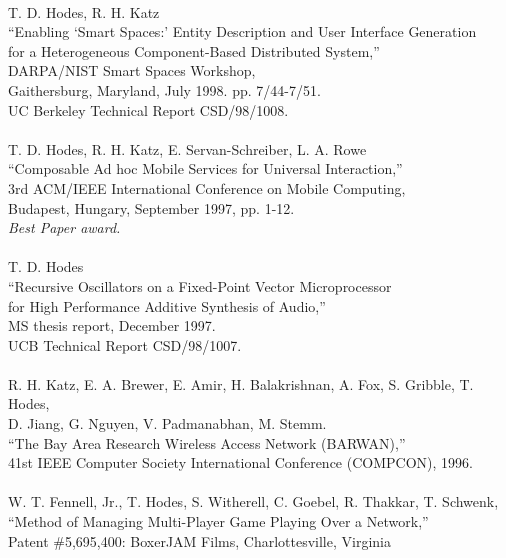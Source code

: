 \begin{tabbing}
\smallskip \\[-3pt]
\>    T. D. Hodes, R. H. Katz \\
\>\>      ``Enabling `Smart Spaces:' Entity Description and User Interface
        Generation \\
\>\>\>     for a Heterogeneous Component-Based Distributed System,'' \\
\>\>       DARPA/NIST Smart Spaces Workshop,  \\
\>\>       Gaithersburg, Maryland, July 1998.  pp. 7/44-7/51.  \\
\>\>       UC Berkeley Technical Report CSD/98/1008. \\
\smallskip \\[-3pt]
\>    T. D. Hodes, R. H. Katz, E. Servan-Schreiber, L. A. Rowe \\
\>\>      ``Composable Ad hoc Mobile Services for Universal Interaction,'' \\
\>\>       3rd ACM/IEEE International Conference on Mobile Computing,  \\
\>\>        Budapest, Hungary, September 1997, pp. 1-12. \\
\>\>        {\em Best Paper award. }\\
\smallskip \\[-3pt]
\>    T. D. Hodes \\
\>\>      ``Recursive Oscillators on a Fixed-Point Vector Microprocessor \\
\>\>\>     for High Performance Additive Synthesis of Audio,'' \\
\>\>       MS thesis report, December 1997. \\
\>\>       UCB Technical Report CSD/98/1007. \\
\smallskip \\[-3pt]
\>    R. H. Katz, E. A. Brewer, E. Amir, H. Balakrishnan, A. Fox,
       S. Gribble, T. Hodes, \\
\>\>\>   D. Jiang, G. Nguyen, V. Padmanabhan, M. Stemm. \\
\>\> ``The Bay Area Research Wireless Access Network (BARWAN),''  \\
\>\> 41st IEEE Computer Society International Conference (COMPCON), 1996. \\
\smallskip \\
\>	W. T. Fennell, Jr., T. Hodes, S. Witherell, C. Goebel, 
	R. Thakkar, T. Schwenk, \\
\>\>	``Method of Managing Multi-Player Game Playing Over a Network,''  \\
\>\>	Patent \#5,695,400: BoxerJAM Films, Charlottesville, Virginia \\

\end{tabbing}
